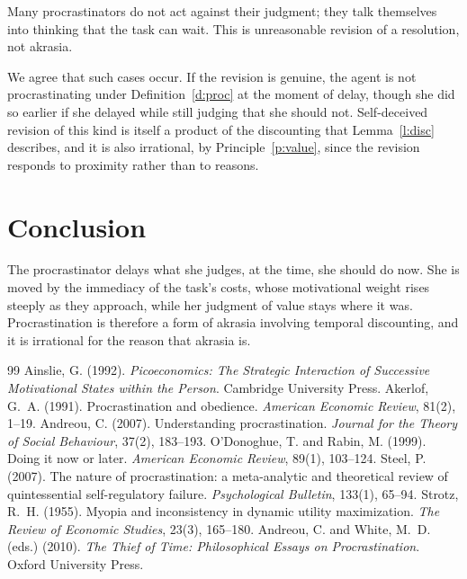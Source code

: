 \documentclass{situationist-preprint}
\begin{document}
\begin{objection}
Many procrastinators do not act against their judgment; they talk themselves into thinking that the task can wait. This is unreasonable revision of a resolution, not akrasia.
\end{objection}

\begin{reply}
We agree that such cases occur. If the revision is genuine, the agent is not procrastinating under Definition~\ref{d:proc} at the moment of delay, though she did so earlier if she delayed while still judging that she should not. Self-deceived revision of this kind is itself a product of the discounting that Lemma~\ref{l:disc} describes, and it is also irrational, by Principle~\ref{p:value}, since the revision responds to proximity rather than to reasons.
\end{reply}

\section{Conclusion}

The procrastinator delays what she judges, at the time, she should do now. She is moved by the immediacy of the task's costs, whose motivational weight rises steeply as they approach, while her judgment of value stays where it was. Procrastination is therefore a form of akrasia involving temporal discounting, and it is irrational for the reason that akrasia is.

\begin{thebibliography}{99}\small
{} Ainslie, G. (1992). \emph{Picoeconomics: The Strategic Interaction of Successive Motivational States within the Person}. Cambridge University Press.
 Akerlof, G.~A. (1991). Procrastination and obedience. \emph{American Economic Review}, 81(2), 1--19.
 Andreou, C. (2007). Understanding procrastination. \emph{Journal for the Theory of Social Behaviour}, 37(2), 183--193.
 O'Donoghue, T. and Rabin, M. (1999). Doing it now or later. \emph{American Economic Review}, 89(1), 103--124.
 Steel, P. (2007). The nature of procrastination: a meta-analytic and theoretical review of quintessential self-regulatory failure. \emph{Psychological Bulletin}, 133(1), 65--94.
 Strotz, R.~H. (1955). Myopia and inconsistency in dynamic utility maximization. \emph{The Review of Economic Studies}, 23(3), 165--180.
 Andreou, C. and White, M.~D. (eds.) (2010). \emph{The Thief of Time: Philosophical Essays on Procrastination}. Oxford University Press.
\end{thebibliography}
\end{document}
